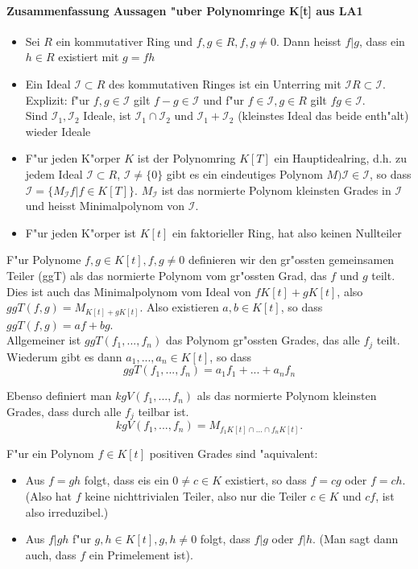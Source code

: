 \documentclass[11pt, a4paper]{article}
\begin{document}
 \paragraph{Zusammenfassung Aussagen "uber Polynomringe K[t] aus LA1}
 \begin{itemize}
 \item Sei $R$ ein kommutativer Ring und $f, g \in R, f, g \neq 0$. Dann heisst $f|g$, dass ein $h \in R$ existiert mit $g = fh$
 \item Ein Ideal $\mathcal{I} \subset R$ des kommutativen Ringes ist ein Unterring mit $\mathcal{I}R \subset \mathcal{I}$. Explizit: f"ur $f, g \in \mathcal{I}$ gilt $f-g \in \mathcal{I}$ und f"ur $f \in \mathcal{I}, g \in R$ gilt $fg \in \mathcal{I}$. 
 \\
 Sind $\mathcal{I}_1, \mathcal{I}_2$ Ideale, ist $\mathcal{I}_1 \cap \mathcal{I}_2$ und $\mathcal{I}_1 + \mathcal{I}_2$ (kleinstes Ideal das beide enth"alt) wieder Ideale
 \item F"ur jeden K"orper $K$ ist der Polynomring $K[T]$ ein Hauptidealring, d.h. zu jedem Ideal $\mathcal{I} \subset R$, $\mathcal{I} \neq \{0\}$ gibt es ein eindeutiges Polynom $M)\mathcal{I} \in \mathcal{I}$, so dass $\mathcal{I} = \{ M_\mathcal{I}f| f\in K[T]\}$. $M_\mathcal{I}$ ist das normierte Polynom kleinsten Grades in $\mathcal{I}$ und heisst Minimalpolynom von $\mathcal{I}$.
 \item F"ur jeden K"orper ist $K[t]$ ein faktorieller Ring, hat also keinen Nullteiler
 \end{itemize}
 
 
 \begin{definition}
 F"ur Polynome $f, g \in K[t], f, g \neq 0$ definieren wir den gr"ossten gemeinsamen Teiler (ggT) als das normierte Polynom vom gr"ossten Grad, das $f$ und $g$ teilt. Dies ist auch das Minimalpolynom vom Ideal von $f K[t] + g K[t]$, also $ggT(f, g) = M_{ K[t] + g K[t]}.$
 Also existieren $a, b \in K[t]$, so dass $ggT(f, g) = af + bg$.
 \\
 Allgemeiner ist $ggT(f_1, ..., f_n)$ das Polynom gr"ossten Grades, das alle $f_j$ teilt. Wiederum gibt es dann $a_1, ..., a_n \in K[t]$, so dass 
 $$
 ggT(f_1, ..., f_n) = a_1 f_1 + ... + a_n f_n
 $$
 
 Ebenso definiert man $kgV(f_1, ..., f_n)$ als das normierte Polynom kleinsten Grades, dass durch alle $f_j$ teilbar ist. 
 $$
 kgV(f_1, ..., f_n) = M_{f_1K[t] \cap ... \cap f_n K[t]}.$$
 \end{definition}
 
 \begin{lemma}
 F"ur ein Polynom $f \in K[t]$ positiven Grades sind "aquivalent:
\begin{itemize}
\item Aus $f = gh$ folgt, dass eis ein $0 \neq c \in K$ existiert, so dass $f = cg$ oder $f = ch$. (Also hat $f$ keine nichttrivialen Teiler, also nur die Teiler $c \in K$ und $cf$, ist also irreduzibel.)
\item Aus $f|gh$ f"ur $g, h \in K[t], g, h \neq 0$ folgt, dass $f|g$ oder $f|h$. (Man sagt dann auch, dass $f$ ein Primelement ist).
\end{itemize}
 \end{lemma}
 
\end{document}
